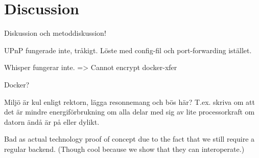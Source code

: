 \chapter{Discussion}

Diskussion och metoddiskussion!

UPnP fungerade inte, tråkigt. Löste med config-fil och port-forwarding istället.

Whisper fungerar inte. => Cannot encrypt docker-xfer

Docker?

Miljö är kul enligt rektorn, lägga resonnemang och bös här? T.ex. skriva om att det är mindre energiförbrukning om alla delar med sig av lite processorkraft om datorn ändå är på eller dylikt. 

Bad as actual technology proof of concept due to the fact that we still require a regular backend. (Though cool because we show that they can interoperate.)
